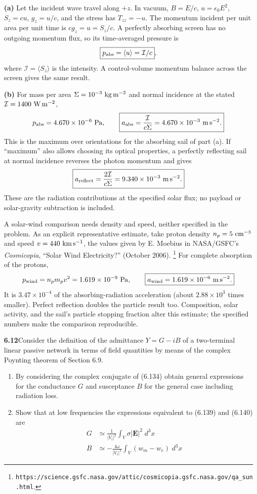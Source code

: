 \textbf{(a)} Let the incident wave travel along $+z$. In vacuum,
$B=E/c$, $u=\epsilon_0E^2$, $S_z=cu$, $g_z=u/c$, and the stress has
$T_{zz}=-u$. The momentum incident per unit area per unit time is
$c g_z=u=S_z/c$. A perfectly absorbing screen has no outgoing momentum
flux, so its time-averaged pressure is
\[
\boxed{p_{\rm abs}=\langle u\rangle=\mathcal I/c},
\]
where $\mathcal I=\langle S_z\rangle$ is the intensity. A control-volume
momentum balance across the screen gives the same result.

\textbf{(b)} For mass per area $\Sigma=10^{-3}\ {\rm kg\,m^{-2}}$ and
normal incidence at the stated $\mathcal I=1400\ {\rm W\,m^{-2}}$,
\[
 p_{\rm abs}=4.670\times10^{-6}\ {\rm Pa},\qquad
\boxed{a_{\rm abs}=\frac{\mathcal I}{c\Sigma}
=4.670\times10^{-3}\ {\rm m\,s^{-2}}.}
\]
This is the maximum over orientations for the absorbing sail of part (a).
If ``maximum'' also allows choosing its optical properties, a perfectly
reflecting sail at normal incidence reverses the photon momentum and gives
\[
\boxed{a_{\rm reflect}=\frac{2\mathcal I}{c\Sigma}
=9.340\times10^{-3}\ {\rm m\,s^{-2}}.}
\]
These are the radiation contributions at the specified solar flux; no
payload or solar-gravity subtraction is included.

A solar-wind comparison needs density and speed, neither specified in
the problem. As an explicit representative estimate, take proton density
$n_p=5\ {\rm cm^{-3}}$ and speed $v=440\ {\rm km\,s^{-1}}$, the values
given by E. Moebius in NASA/GSFC's \emph{Cosmicopia}, ``Solar Wind
Electricity?'' (October 2006).
\footnote{\texttt{https://science.gsfc.nasa.gov/attic/cosmicopia.gsfc.nasa.gov/qa\_sun.html}.}
For complete absorption of the protons,
\[
p_{\rm wind}=n_pm_pv^2=1.619\times10^{-9}\ {\rm Pa},\qquad
\boxed{a_{\rm wind}=1.619\times10^{-6}\ {\rm m\,s^{-2}}.}
\]
It is $3.47\times10^{-4}$ of the absorbing-radiation acceleration
(about $2.88\times10^3$ times smaller). Perfect reflection doubles the
particle result too. Composition, solar activity, and the sail's particle
stopping fraction alter this estimate; the specified numbers make the
comparison reproducible.

\par\bigskip
\noindent\textbf{6.12}\quad Consider the definition of the admittance $Y=G-iB$ of a two-terminal linear passive network in terms of field quantities by means of the complex Poynting theorem of Section 6.9.
\begin{enumerate}
\item[(a)] By considering the complex conjugate of (6.134) obtain general expressions for the conductance $G$ and susceptance $B$ for the general case including radiation loss.
\item[(b)] Show that at low frequencies the expressions equivalent to (6.139) and (6.140) are
\begin{align*}
G&\simeq\frac{1}{|V_{i}|^{2}}\int_{V}\sigma|\mathbf{E}|^{2}\;d^{3}x\\
B&\simeq-\frac{4\omega}{|V_{i}|^{2}}\int_{V}(w_{m}-w_{e})\;d^{3}x
\end{align*}
\end{enumerate}
\solution

